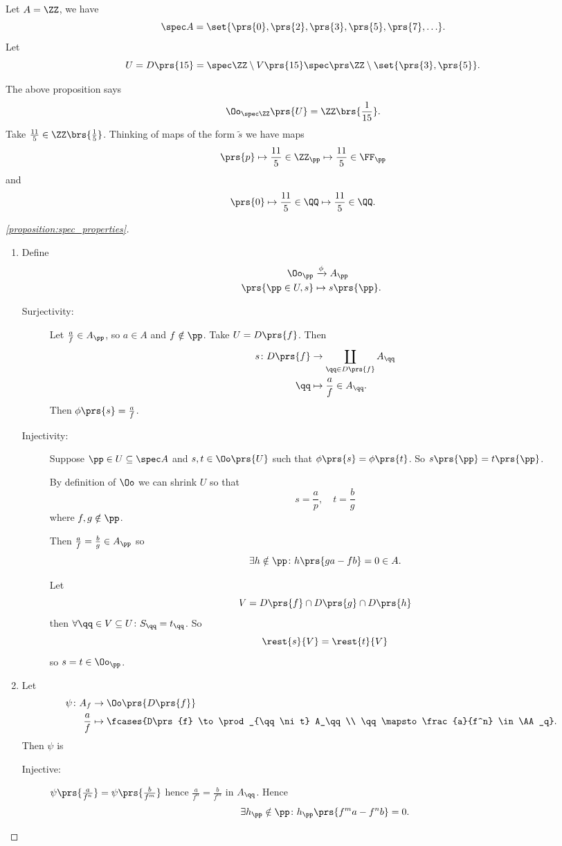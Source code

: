 \documentclass[10pt,a4paper,twoside,openany,hidelinks]{book}
\begin{document}
\begin{example}
Let $A = \ZZ$, we have \[\spec A = \set{\prs{0}, \prs{2}, \prs{3}, \prs{5}, \prs{7}, \ldots}\text{.}\]
Let \[U = D\prs{15} = \spec \ZZ \setminus V\prs{15} \spec\prs \ZZ \setminus \set{\prs{3}, \prs{5}} \text{.}\]

The above proposition says
\[\Oo_{\spec \ZZ}\prs{U} = \ZZ \brs{\frac{1}{15}} \text{.}\]
Take $\frac{11}{5} \in \ZZ\brs{\frac{1}{5}}$.
Thinking of maps of the form $\tilde{s}$ we have maps
\[\prs{p} \mapsto \frac{11}{5} \in \ZZ_\pp \mapsto \frac{11}{5} \in \FF_\pp\]
and
\[\prs{0} \mapsto \frac{11}{5} \in \QQ \mapsto \frac{11}{5} \in \QQ \text{.}\]
\end{example}

\begin{proof}[\ref{proposition:spec_properties}]
\begin{enumerate}
\item Define
\begin{align*}
\Oo_\pp &\xrightarrow{\phi} A_\pp \\
\prs{\pp \in U,s} &\mapsto s\prs{\pp} \text{.}
\end{align*}
\begin{description}
\item[Surjectivity:]
Let $\frac{a}{f} \in A_\pp$, so $a \in A$ and $f \notin \pp$.
Take $U = D\prs{f}$. Then
\begin{align*}
s \colon D\prs{f} &\to \coprod_{\qq \in D\prs{f}} A_\qq \\
\qq &\mapsto \frac{a}{f} \in A_\qq \text{.}
\end{align*}
Then
$\phi\prs{s} = \frac{a}{f}$.
\item[Injectivity:]
Suppose $\pp \in U \subseteq \spec A$ and $s,t \in \Oo\prs{U}$ such that $\phi\prs{s} = \phi\prs{t}$. So $s\prs{\pp} = t\prs{\pp}$.

By definition of $\Oo$ we can shrink $U$ so that
\[s = \frac{a}{p}, \quad t = \frac{b}{g}\]
where $f,g \notin \pp$.

Then
$\frac{a}{f} = \frac{b}{g} \in A_\pp$
so
\[\exists h \notin \pp \colon h\prs{ga - fb} = 0 \in A \text{.}\]

Let \[V = D\prs{f} \cap D\prs{g} \cap D\prs{h}\]
then $\forall \qq \in V \subseteq U \colon S_\qq = t_\qq$.
So
\[\rest{s}{V} = \rest{t}{V}\]
so $s = t \in \Oo_\pp$.
\end{description}
\item
Let
\begin{align*}
\psi \colon A_f &\to \Oo\prs{D\prs{f}} \\
\frac{a}{f} &\mapsto \fcases{D\prs{f} \to \prod_{\qq \ni t} A_\qq \\ \qq \mapsto \frac{a}{f^n} \in \AA_q} \text{.}
\end{align*}
Then $\psi$ is
\begin{description}
\item[Injective:]
$\psi\prs{\frac{a}{f^n}} = \psi\prs{\frac{b}{f^m}}$
hence
$\frac{a}{f^n} = \frac{b}{f^m}$ in $A_\qq$.
Hence
\[\exists h_\pp \notin \pp \colon h_\pp \prs{f^m a - f^n b} = 0 \text{.}\]


\end{description}
\end{enumerate}
\end{proof}
\end{document}
